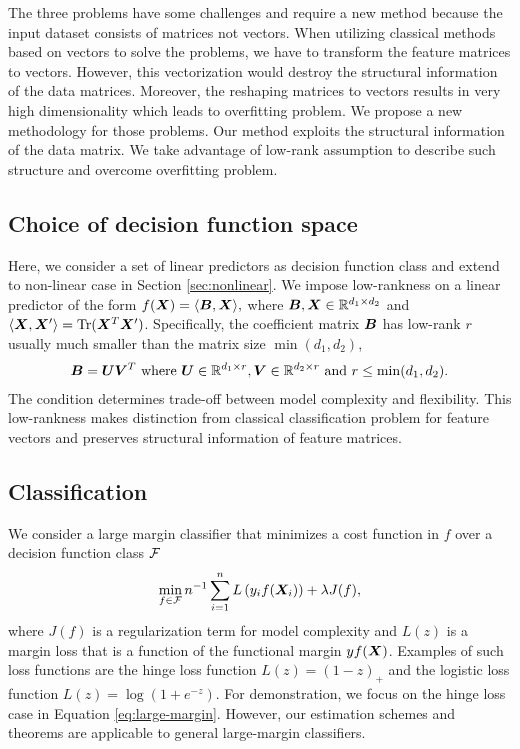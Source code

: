 \documentclass[12pt]{article}
\begin{document}
The three problems have some challenges and require a new method because the input dataset consists of matrices not vectors.
When utilizing classical methods based on vectors to solve the problems, we have to transform the feature matrices to vectors. However, this vectorization would destroy the structural information of the data matrices. Moreover, the reshaping matrices to vectors results in very high dimensionality which leads to overfitting problem.
We propose a new methodology for those problems. Our method exploits the structural information of the data matrix. We take advantage of low-rank assumption to describe such structure and overcome overfitting problem.

\subsection{Choice of decision function space}\label{sec:fcn class}
Here, we consider a set of linear predictors as decision function class and extend to non-linear case in Section \ref{sec:nonlinear}.
 We impose low-rankness on a linear predictor of the form $f(\bm X) = \langle \bm B,\bm X\rangle,$
where $\bm B,\bm X\in\mathbb{R}^{d_1\times d_2}$ and $\langle \bm X,\bm X'\rangle = \text{Tr}(\bm X^T\bm X')$.
Specifically,  the coefficient matrix $\bm B$ has low-rank $r$  usually much smaller than the matrix size  $\min(d_1,d_2)$,
\begin{align}\label{eq:lowrank}
\bm B = \bm{U}\bm{V}^T \text{ where } \bm{U} \in\mathbb{R}^{d_1\times r} ,\bm{V}\in\mathbb{R}^{d_2\times r}\text{ and } r\leq\min(d_1,d_2).
\end{align}
The condition determines trade-off between model complexity and flexibility.  This low-rankness makes distinction from classical classification problem for feature vectors and preserves structural information of feature matrices.
 
\subsection{Classification}
\label{subsec:pb1}

We consider a large margin classifier that minimizes a cost function in $f$ over a decision function class $\mathcal{F}$
\begin{align}
\label{eq:large-margin}
\min_{f\in\mathcal{F}}n^{-1}\sum_{i=1}^n L\left(y_i f(\bm X_i)\right)+\lambda J(f),
\end{align}
where $J(f)$ is a regularization term for model complexity and $L(z)$ is a margin loss that is a function of the functional margin $yf(\bm X)$. Examples of such loss functions are the hinge loss function $L(z) = (1-z)_+$ and the logistic loss function $L(z) =\log(1+e^{-z})$.  For demonstration, we focus on the hinge loss case in Equation \eqref{eq:large-margin}. However, our estimation schemes and theorems are applicable to general large-margin classifiers.
\end{document}
